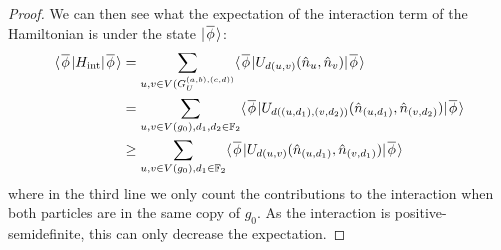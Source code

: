\documentclass[../thesis-main/thesis-main]{subfiles}
\begin{document}
\begin{proof}
  We can then see what the expectation of the interaction term of the Hamiltonian is under the state $|\mspace{2mu} \overline{\phi} \mspace{2mu} \rangle$: 
  \begin{align}
    \langle\mspace{2mu} \overline{\phi} \mspace{2mu} | H_\text{int} |\mspace{2mu} \overline{\phi} \mspace{2mu} \rangle &= \sum_{u,v\in V(G_U^{(a,b),(c,d))}} \langle\mspace{2mu} \overline{\phi} \mspace{2mu} | U_{d(u,v)}(\hat{n}_u,\hat{n}_v) |\mspace{2mu} \overline{\phi} \mspace{2mu} \rangle\\
      &= \sum_{u,v\in V(g_0),d_1,d_2\in \mathbb{F}_2} \langle\mspace{2mu} \overline{\phi} \mspace{2mu} | U_{d((u,d_1),(v,d_2))}(\hat{n}_{(u,d_1)},\hat{n}_{(v,d_2)}) |\mspace{2mu} \overline{\phi} \mspace{2mu} \rangle\\
      &\geq \sum_{u,v\in V(g_0),d_1\in \mathbb{F}_2} \langle\mspace{2mu} \overline{\phi} \mspace{2mu} | U_{d(u,v)} (\hat{n}_{(u,d_1)},\hat{n}_{(v,d_1)}) |\mspace{2mu} \overline{\phi} \mspace{2mu} \rangle
  \end{align}
  where in the third line we only count the contributions to the interaction when both particles are in the same copy of $g_0$.  As the interaction is positive-semidefinite, this can only decrease the expectation.  
  

\end{proof}
\end{document}
